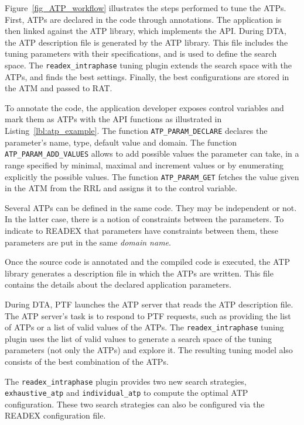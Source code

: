 Figure~\ref{fig_ATP_workflow} illustrates the steps performed to tune the ATPs. First, ATPs are declared in the code through annotations. The application is then linked against the ATP library, which implements the API. During DTA, the ATP description file is generated by the ATP library. This file includes the tuning parameters with their specifications, and is used to define the search space. The \texttt{readex\_intraphase} tuning plugin extends the search space with the ATPs, and finds the best settings. Finally, the best configurations are stored in the ATM and passed to RAT.

To annotate the code, the application developer exposes control variables and mark them as ATPs with the API functions as illustrated in Listing~\ref{lbl:atp_example}. The function \texttt{ATP\_PARAM\_DECLARE} declares the parameter's name, type, default value and domain. The function \texttt{ATP\_PARAM\_ADD\_VALUES} allows to add possible values the parameter can take, in a range specified by minimal, maximal and increment values or by enumerating explicitly the possible values. The function \texttt{ATP\_PARAM\_GET} fetches the value given in the ATM from the RRL and assigns it to the control variable. 

Several ATPs can be defined in the same code. They may be independent or not. In the latter case, there is a notion of constraints between the parameters. To indicate to READEX that parameters have constraints between them, these parameters are put in the same \textit{domain name}.

Once the source code is annotated and the compiled code is executed, the ATP library generates a description file in which the ATPs are written. This file contains the details about the declared application parameters.

During DTA, PTF launches the ATP server that reads the ATP description file. The ATP server's task is to respond to PTF requests, such as providing the list of ATPs or a list of valid values of the ATPs. The \texttt{readex\_intraphase} tuning plugin uses the list of valid values to generate a search space of the tuning parameters (not only the ATPs) and explore it. The resulting tuning model also consists of the best combination of the ATPs.

The \texttt{readex\_intraphase} plugin provides two new search strategies, \linebreak \texttt{exhaustive\_atp} and \texttt{individual\_atp} to compute the optimal ATP configuration. These two search strategies can also be configured via the READEX configuration file.

